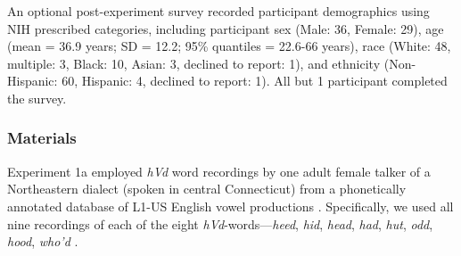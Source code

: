 \documentclass[preprint]{JASA}
\begin{document}
An optional post-experiment survey recorded participant demographics using NIH prescribed categories, including participant sex (Male: 36, Female: 29), age (mean = 36.9 years; SD = 12.2; 95\% quantiles = 22.6-66 years), race (White: 48, multiple: 3, Black: 10, Asian: 3, declined to report: 1), and ethnicity (Non-Hispanic: 60, Hispanic: 4, declined to report: 1). All but 1 participant completed the survey.

\subsubsection{Materials}\label{sec:stimuli}

Experiment 1a employed \emph{hVd} word recordings by one adult female talker of a Northeastern dialect (spoken in central Connecticut) from a phonetically annotated database of L1-US English vowel productions \citep{xie-jaeger2020}. Specifically, we used all nine recordings of each of the eight \emph{hVd}-words---\emph{heed}, \emph{hid}, \emph{head}, \emph{had}, \emph{hut}, \emph{odd}, \emph{hood}, \emph{who'd} \citetext{\citealp[the use of ``hut'' and ``odd'' rather than ``hud'' and ``hod'' follows][]{assmann2008}; \citealp[but see][]{hillenbrand1995}}.
\end{document}
